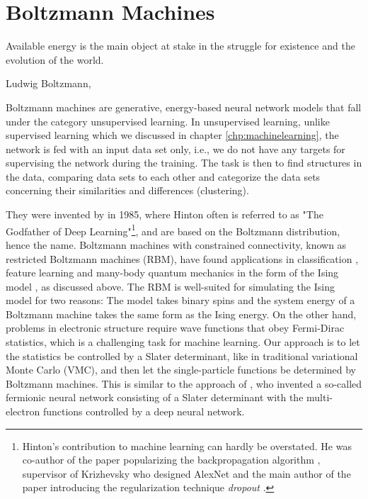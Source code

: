 \chapter{Boltzmann Machines} \label{chp:restricted}
\epigraph{Available energy is the main object at stake in the struggle for existence and the evolution of the world.}{Ludwig Boltzmann, \supercite{rajasekar_ludwig_2006}}
\iffalse
\begin{figure}[H]
	\centering
	\texttt{[image: Images/example.png]}
	\caption{Caption}
\end{figure}
\fi

Boltzmann machines are generative, energy-based neural network models that fall under the category unsupervised learning. In unsupervised learning, unlike supervised learning which we discussed in chapter \ref{chp:machinelearning}, the network is fed with an input data set only, i.e., we do not have any targets for supervising the network during the training. The task is then to find structures in the data, comparing data sets to each other and categorize the data sets concerning their similarities and differences (clustering).

They were invented by \citet{ackley_learning_1985} in 1985, where Hinton often is referred to as "The Godfather of Deep Learning"\footnote{Hinton's contribution to machine learning can hardly be overstated. He was co-author of the paper popularizing the backpropagation algorithm \supercite{rumelhart_learning_1986}, supervisor of Krizhevsky who designed AlexNet \supercite{krizhevsky_imagenet_2012} and the main author of the paper introducing the regularization technique \textit{dropout} \supercite{hinton_improving_2012}.}, and are based on the Boltzmann distribution, hence the name. Boltzmann machines with constrained connectivity, known as restricted Boltzmann machines (RBM), have found applications in classification \supercite{larochelle_classification_2008}, feature learning \supercite{coates_analysis_2011} and many-body quantum mechanics in the form of the Ising model \supercite{carleo_solving_2017}, as discussed above. The RBM is well-suited for simulating the Ising model for two reasons: The model takes binary spins and the system energy of a Boltzmann machine takes the same form as the Ising energy. On the other hand, problems in electronic structure require wave functions that obey Fermi-Dirac statistics, which is a challenging task for machine learning. Our approach is to let the statistics be controlled by a Slater determinant, like in traditional variational Monte Carlo (VMC), and then let the single-particle functions be determined by Boltzmann machines. This is similar to the approach of \citet{pfau2019abinitio}, who invented a so-called fermionic neural network consisting of a Slater determinant with the multi-electron functions controlled by a deep neural network. 

